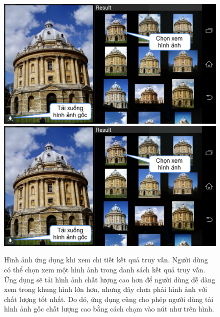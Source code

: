 \begin{figure}[!htbp]
  \begin{center}
    \leavevmode
    \ifpdf
      \includegraphics[scale=0.35]{interface_4}
    \else
      \includegraphics[scale=0.35]{interface_4}
    \fi
    \caption[Hình ảnh ứng dụng khi xem chi tiết kết quả truy vấn]{Hình ảnh ứng dụng khi xem chi tiết kết quả truy vấn. Người dùng có thể chọn xem một hình ảnh trong danh sách kết quả truy vấn. Ứng dụng sẽ tải hình ảnh chất lượng cao hơn để người dùng dễ dàng xem trong khung hình lớn hơn, nhưng đây chưa phải hình ảnh với chất lượng tốt nhất. Do dó, ứng dụng cũng cho phép người dùng tải hình ảnh gốc chất lượng cao bằng cách chạm vào nút như trên hình.}
    \label{FigInterface4}
  \end{center}
\end{figure}

